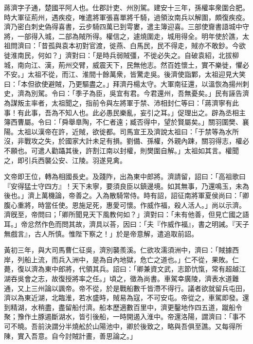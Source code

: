 \begin{pinyinscope}
 
 
 蔣濟字子通，楚國平阿人也。仕郡計吏、州別駕。建安十三年，孫權率衆圍合肥。時大軍征荊州，遇疾疫，唯遣將軍張喜單將千騎，過領汝南兵以解圍，頗復疾疫。濟乃密白刺史偽得喜書，云步騎四萬已到雩婁，遣主簿迎喜。三部使齎書語城中守將，一部得入城，二部為賊所得。權信之，遽燒圍走，城用得全。明年使於譙，太祖問濟曰：「昔孤與袁本初對官渡，徙燕、白馬民，民不得走，賊亦不敢鈔。今欲徙淮南民，何如？」濟對曰：「是時兵弱賊彊，不徙必失之。自破袁紹，北拔柳城，南向江、漢，荊州交臂，威震天下，民無他志。然百姓懷土，實不樂徙，懼必不安。」太祖不從，而江、淮間十餘萬衆，皆驚走吳。後濟使詣鄴，太祖迎見大笑曰：「本但欲使避賊，乃更驅盡之。」拜濟丹楊太守。大軍南征還，以溫恢為揚州刺史，濟為別駕。令曰：「季子為臣，吳宜有君。今君還州，吾無憂矣。」民有誣告濟為謀叛主率者，太祖聞之，指前令與左將軍于禁、沛相封仁等曰：「蔣濟寧有此事！有此事，吾為不知人也。此必愚民樂亂，妄引之耳。」促理出之。辟為丞相主簿西曹屬。令曰：「舜舉臯陶，不仁者遠；臧否得中，望於賢屬矣。」關羽圍樊、襄陽。太祖以漢帝在許，近賊，欲徙都。司馬宣王及濟說太祖曰：「于禁等為水所沒，非戰攻之失，於國家大計未足有損。劉備、孫權，外親內踈，關羽得志，權必不願也。可遣人勸躡其後，許割江南以封權，則樊圍自解。」太祖如其言。權聞之，即引兵西襲公安、江陵。羽遂見禽。
 
 
 
 
 文帝即王位，轉為相國長史。及踐阼，出為東中郎將。濟請留，詔曰：「高祖歌曰『安得猛士守四方』！天下未寧，要須良臣以鎮邊境。如其無事，乃還鳴玉，未為後也。」濟上萬機論，帝善之。入為散騎常侍。時有詔，詔征南將軍夏侯尚曰：「卿腹心重將，時當任使。恩施足死，惠愛可懷。作威作福，殺人活人。」尚以示濟。濟旣至，帝問曰；「卿所聞見天下風教何如？」濟對曰：「未有他善，但見亡國之語耳。」帝忿然作色而問其故，濟具以荅，因曰：「夫『作威作福』，書之明誡。『天子無戲言』，古人所慎。惟陛下察之！」於是帝意解，遣追取前詔。
 
 
 
 
 黃初三年，與大司馬曹仁征吳，濟別襲羨溪。仁欲攻濡須洲中，濟曰：「賊據西岸，列船上流，而兵入洲中，是為自內地獄，危亡之道也。」仁不從，果敗。仁薨，復以濟為東中郎將，代領其兵。詔曰：「卿兼資文武，志節忼愾，常有超越江湖吞吳會之志，故復授將率之任。」頃之，徵為尚書。車駕幸廣陵，濟表水道難通，又上三州論以諷帝。帝不從，於是戰船數千皆滯不得行。議者欲就留兵屯田，濟以為東近湖，北臨淮，若水盛時，賊易為寇，不可安屯。帝從之，車駕即發。還到精湖，水稍盡，盡留船付濟。船本歷適數百里中，濟更鑿地作四五道，蹴船令聚；豫作土豚遏斷湖水，皆引後船，一時開遏入淮中。帝還洛陽，謂濟曰：「事不可不曉。吾前決謂分半燒舩於山陽池中，卿於後致之，略與吾俱至譙。又每得所陳，實入吾意。自今討賊計畫，善思論之。」
 

\end{pinyinscope}
